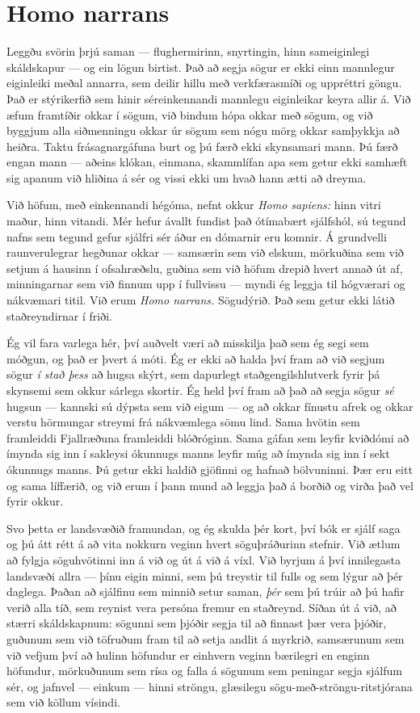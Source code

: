\section*{Homo narrans}

Leggðu svörin þrjú saman — flughermirinn, snyrtingin, hinn sameiginlegi skáldskapur — og ein lögun birtist. Það að segja sögur er ekki einn mannlegur eiginleiki meðal annarra, sem deilir hillu með verkfærasmíði og uppréttri göngu. Það er stýrikerfið sem hinir séreinkennandi mannlegu eiginleikar keyra allir á. Við æfum framtíðir okkar í sögum, við bindum hópa okkar með sögum, og við byggjum alla siðmenningu okkar úr sögum sem nógu mörg okkar samþykkja að heiðra. Taktu frásagnargáfuna burt og þú færð ekki skynsamari mann. Þú færð engan mann — aðeins klókan, einmana, skammlífan apa sem getur ekki samhæft sig apanum við hliðina á sér og vissi ekki um hvað hann ætti að dreyma.

Við höfum, með einkennandi hégóma, nefnt okkur \emph{Homo sapiens:} hinn vitri maður, hinn vitandi. Mér hefur ávallt fundist það ótímabært sjálfshól, sú tegund nafns sem tegund gefur sjálfri sér áður en dómarnir eru komnir. Á grundvelli raunverulegrar hegðunar okkar — samsærin sem við elskum, mörkuðina sem við setjum á hausinn í ofsahræðslu, guðina sem við höfum drepið hvert annað út af, minningarnar sem við finnum upp í fullvissu — myndi ég leggja til hógværari og nákvæmari titil. Við erum \emph{Homo narrans.} Sögudýrið. Það sem getur ekki látið staðreyndirnar í friði.

Ég vil fara varlega hér, því auðvelt væri að misskilja það sem ég segi sem móðgun, og það er þvert á móti. Ég er ekki að halda því fram að við segjum sögur \emph{í stað þess} að hugsa skýrt, sem dapurlegt staðgengilshlutverk fyrir þá skynsemi sem okkur sárlega skortir. Ég held því fram að það að segja sögur \emph{sé} hugsun — kannski sú dýpsta sem við eigum — og að okkar fínustu afrek og okkar verstu hörmungar streymi frá nákvæmlega sömu lind. Sama hvötin sem framleiddi Fjallræðuna framleiddi blóðróginn. Sama gáfan sem leyfir kviðdómi að ímynda sig inn í sakleysi ókunnugs manns leyfir múg að ímynda sig inn í sekt ókunnugs manns. Þú getur ekki haldið gjöfinni og hafnað bölvuninni. Þær eru eitt og sama líffærið, og við erum í þann mund að leggja það á borðið og virða það vel fyrir okkur.

Svo þetta er landsvæðið framundan, og ég skulda þér kort, því bók er sjálf saga og þú átt rétt á að vita nokkurn veginn hvert söguþráðurinn stefnir. Við ætlum að fylgja söguhvötinni inn á við og út á við á víxl. Við byrjum á því innilegasta landsvæði allra — þínu eigin minni, sem þú treystir til fulls og sem lýgur að þér daglega. Þaðan að sjálfinu sem minnið setur saman, \emph{þér} sem þú trúir að þú hafir verið alla tíð, sem reynist vera persóna fremur en staðreynd. Síðan út á við, að stærri skáldskapnum: sögunni sem þjóðir segja til að finnast þær vera þjóðir, guðunum sem við töfruðum fram til að setja andlit á myrkrið, samsærunum sem við vefjum því að hulinn höfundur er einhvern veginn bærilegri en enginn höfundur, mörkuðunum sem rísa og falla á sögunum sem peningar segja sjálfum sér, og jafnvel — einkum — hinni ströngu, glæsilegu sögu-með-ströngu-ritstjórana sem við köllum vísindi.

